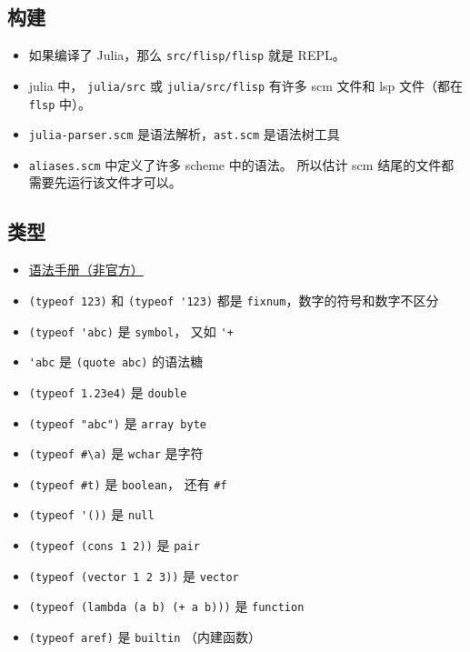 
\subsection{构建}
\begin{itemize}
\item 如果编译了 Julia，那么 \verb`src/flisp/flisp` 就是 REPL。
\item julia 中， \verb`julia/src` 或 \verb`julia/src/flisp` 有许多 scm 文件和 lsp 文件（都在 \verb`flsp` 中）。
\item \verb`julia-parser.scm` 是语法解析，\verb`ast.scm` 是语法树工具
\item \verb`aliases.scm` 中定义了许多 scheme 中的语法。 所以估计 scm 结尾的文件都需要先运行该文件才可以。
\end{itemize}


\subsection{类型}
\begin{itemize}
\item \href{https://code.google.com/archive/p/femtolisp/wikis/Manual.wiki}{语法手册（非官方）}
\item \verb`(typeof 123)` 和 \verb`(typeof '123)` 都是 \verb`fixnum`，数字的符号和数字不区分
\item \verb`(typeof 'abc)` 是 \verb`symbol`， 又如 \verb`'+`
\item \verb`'abc` 是 \verb`(quote abc)` 的语法糖
\item \verb`(typeof 1.23e4)` 是 \verb`double`
\item \verb`(typeof "abc")` 是 \verb`array byte`
\item \verb`(typeof #\a)` 是 \verb`wchar` 是字符
\item \verb`(typeof #t)` 是 \verb`boolean`， 还有 \verb`#f`
\item \verb`(typeof '())` 是 \verb`null`
\item \verb`(typeof (cons 1 2))` 是 \verb`pair`
\item \verb`(typeof (vector 1 2 3))` 是 \verb`vector`
\item \verb`(typeof (lambda (a b) (+ a b)))` 是 \verb`function`
\item \verb`(typeof aref)` 是 \verb`builtin` （内建函数）
\end{itemize}

